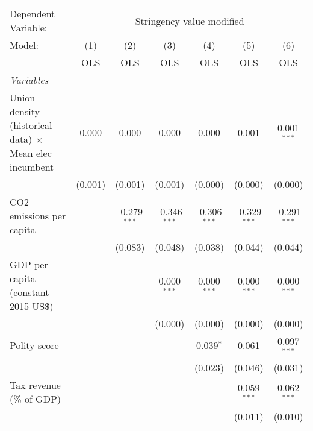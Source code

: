 
\begingroup
\centering
\begin{tabular}{lcccccc}
   \toprule
   Dependent Variable: & \multicolumn{6}{c}{Stringency value modified}\\
   Model:                                                        & (1)     & (2)            & (3)            & (4)            & (5)            & (6)\\  
                                                                 &  OLS    & OLS            & OLS            & OLS            & OLS            & OLS\\  
   \midrule
   \emph{Variables}\\
   Union density (historical data) $\times$ Mean elec incumbent  & 0.000   & 0.000          & 0.000          & 0.000          & 0.001          & 0.001$^{***}$\\   
                                                                 & (0.001) & (0.001)        & (0.001)        & (0.000)        & (0.000)        & (0.000)\\   
   CO2 emissions per capita                                      &         & -0.279$^{***}$ & -0.346$^{***}$ & -0.306$^{***}$ & -0.329$^{***}$ & -0.291$^{***}$\\   
                                                                 &         & (0.083)        & (0.048)        & (0.038)        & (0.044)        & (0.044)\\   
   GDP per capita (constant 2015 US\$)                           &         &                & 0.000$^{***}$  & 0.000$^{***}$  & 0.000$^{***}$  & 0.000$^{***}$\\   
                                                                 &         &                & (0.000)        & (0.000)        & (0.000)        & (0.000)\\   
   Polity score                                                  &         &                &                & 0.039$^{*}$    & 0.061          & 0.097$^{***}$\\   
                                                                 &         &                &                & (0.023)        & (0.046)        & (0.031)\\   
   Tax revenue (\% of GDP)                                       &         &                &                &                & 0.059$^{***}$  & 0.062$^{***}$\\   
                                                                 &         &                &                &                & (0.011)        & (0.010)\\   

\end{tabular}
